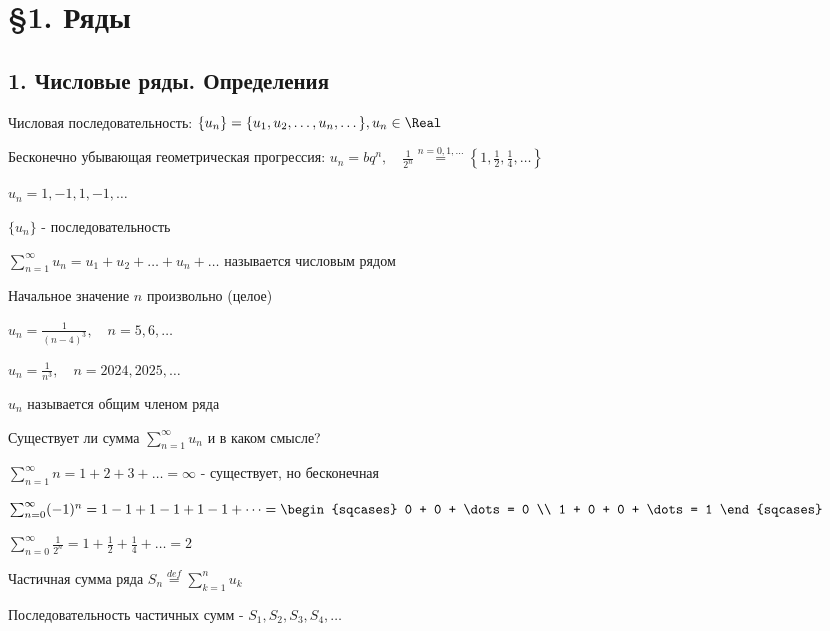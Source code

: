 \documentclass[12pt]{article}
\begin{document}
    \tableofcontents
    \clearpage


    \section{\S 1. Ряды}

    \subsection{1. Числовые ряды. Определения}

    \Mems Числовая последовательность: $\{u_n\} = \{u_1, u_2, \dots, u_n, \dots\}, u_n \in \Real$

     Бесконечно убывающая геометрическая прогрессия: $u_n = b q^n, \quad
    \frac{1}{2^n} \stackrel{n = 0,1,\dots}{=} \left\{1, \frac{1}{2}, \frac{1}{4}, \dots\right\}$

     $u_n = 1, -1, 1, -1, \dots$

    \hypertarget{numberseriesdefinition}{}

    \Def $\{u_n\}$ - последовательность

    $\sum_{n = 1}^{\infty} u_n = u_1 + u_2 + \dots + u_n + \dots$ называется числовым рядом

    \Notas Начальное значение $n$ произвольно (целое)

    \Ex $u_n = \frac{1}{(n - 4)^3}, \quad n = 5, 6, \dots$

    $u_n = \frac{1}{n^3}, \quad n = 2024, 2025, \dots$

    \Notas $u_n$ называется общим членом ряда

    \Nota Существует ли сумма $\sum_{n = 1}^{\infty} u_n$ и в каком смысле?

     $\sum_{n = 1}^{\infty} n = 1 + 2 + 3 + \dots = \infty$ - существует, но бесконечная

     $\sum_{n = 0}^{\infty} (-1)^n = 1 - 1 + 1 - 1 + 1 - 1 + \dots =
    \begin{sqcases}
        0 + 0 + \dots = 0 \\
        1 + 0 + 0 + \dots = 1
    \end{sqcases}$

     $\sum_{n = 0}^\infty \frac{1}{2^n} = 1 + \frac{1}{2} + \frac{1}{4} + \dots = 2$

    \Def Частичная сумма ряда $S_n \stackrel{def}{=} \sum_{k = 1}^{n} u_k$

    \Notas Последовательность частичных сумм - $S_1, S_2, S_3, S_4, \dots$
\end{document}
